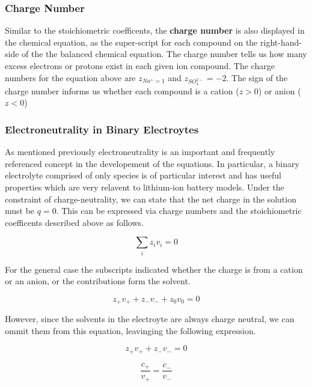 \documentclass[lettersize,journal]{IEEEtran}
\begin{document}
\subsubsection{ Charge Number }

Similar to the stoichiometric coefficents, the \textbf{charge number} is also displayed in the chemical equation, as the super-script for each compound on the right-hand-side of the the balanced chemical equation. The charge number tells us how many excess electrons or protons exist in each given ion compound. The charge numbers for the equation above are $z_{Na^{+} = 1}$ and $ z_{SO_{4}^{2-}} = -2 $. The sign of the charge number informs us whether each compound is a cation ($z>0$) or anion ($z < 0 $)

\subsubsection{ Electroneutrality in Binary Electroytes }
As mentioned previously electroneutrality is an important and frequently referenced concept in the developement of the equations. In particular, a binary electrolyte comprised of only species is of particular interest and has useful properties which are very relavent to lithium-ion battery models. Under the constraint of charge-neutrality, we can state that the net charge in the solution must be $q = 0$. This can be expressed via charge numbers and the stoichiometric coefficents described above as follows.

\begin{equation}
  \sum_{i} z_{i} v_{i}=0
\end{equation}

For the general case the subscripts indicated whether the charge is from a cation or an anion, or the contributions form the solvent.

\begin{equation}
  z_{+} v_{+}+z_{-} v_{-}+z_{0} v_{0}=0
\end{equation}

However, since the solvents in the electroyte are always charge neutral, we can ommit them from this equation, leavinging the following expression.


\begin{equation}
  z_{+} v_{+}+z_{-} v_{-}=0
\end{equation}

\begin{equation}
  \frac{c_{+}}{v_{+}}=\frac{c_{-}}{v_{-}}
\end{equation}
\end{document}
